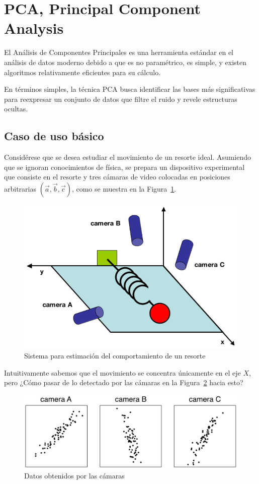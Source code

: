 \documentclass{article}
\begin{document}
\section{PCA, Principal Component Analysis} 
\label{sec:principal_component_analysis_pca}
El Análisis de Componentes Principales es una herramienta estándar en el análisis de datos moderno debido a que es no paramétrico, es simple, y existen algoritmos relativamente eficientes para su cálculo.

En términos simples, la técnica PCA busca identificar las bases más significativas para reexpresar un conjunto de datos que filtre el ruido y revele estructuras ocultas.

\subsection{Caso de uso básico}
\label{sub:ejemplo_basico}
Considérese que se desea estudiar el movimiento de un resorte ideal.
Asumiendo que se ignoran conocimientos de física, se prepara un dispositivo experimental que consiste en el resorte y tres cámaras de video colocadas en posiciones arbitrarias $(\overrightarrow{a},\overrightarrow{b},\overrightarrow{c})$, como se muestra en la Figura~\ref{fig:resorte}.
\begin{figure}
	\centering
	\includegraphics[scale=0.35]{resources/images/resorte}
	\caption{Sistema para estimación del comportamiento de un resorte}
	\label{fig:resorte}
\end{figure}

Intuitivamente sabemos que el movimiento se concentra únicamente en el eje $X$, pero ¿Cómo pasar de lo detectado por las cámaras en la Figura~\ref{fig:camaras} hacia esto?
\begin{figure}
	\centering
	\includegraphics[width=\columnwidth]{resources/images/camaras}
	\caption{Datos obtenidos por las cámaras}
	\label{fig:camaras}
\end{figure}
\end{document}
